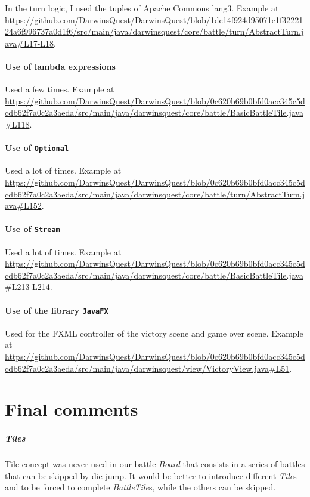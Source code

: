 \documentclass[12pt, a4paper]{report}
\theoremstyle{definition}
\begin{document}
    In the turn logic, I used the tuples of Apache Commons lang3.
    Example at \url{https://github.com/DarwinsQuest/DarwinsQuest/blob/1dc14f924d95071e1f3222124a6f996737a0d1f6/src/main/java/darwinsquest/core/battle/turn/AbstractTurn.java#L17-L18}.

    \subsubsection{Use of lambda expressions}
    
    Used a few times.
    Example at \url{https://github.com/DarwinsQuest/DarwinsQuest/blob/0c620b69b0bfd0acc345c5dcdb62f7a0c2a3aeda/src/main/java/darwinsquest/core/battle/BasicBattleTile.java#L118}.

    \subsubsection{Use of \texttt{Optional}}

    Used a lot of times.
    Example at \url{https://github.com/DarwinsQuest/DarwinsQuest/blob/0c620b69b0bfd0acc345c5dcdb62f7a0c2a3aeda/src/main/java/darwinsquest/core/battle/turn/AbstractTurn.java#L152}.

    \subsubsection{Use of \texttt{Stream}}

    Used a lot of times.
    Example at \url{https://github.com/DarwinsQuest/DarwinsQuest/blob/0c620b69b0bfd0acc345c5dcdb62f7a0c2a3aeda/src/main/java/darwinsquest/core/battle/BasicBattleTile.java#L213-L214}.

    \subsubsection{Use of the library \texttt{JavaFX}}
    Used for the FXML controller of the victory scene and game over scene.
    Example at \url{https://github.com/DarwinsQuest/DarwinsQuest/blob/0c620b69b0bfd0acc345c5dcdb62f7a0c2a3aeda/src/main/java/darwinsquest/view/VictoryView.java#L51}.


\chapter{Final comments}

    \paragraph{Tiles}
    Tile concept was never used in our battle \emph{Board} that consists in a series of battles that can be skipped by die jump.
    It would be better to introduce different \emph{Tile}s and to be forced to complete \emph{BattleTile}s, while the others can be skipped.
\end{document}
